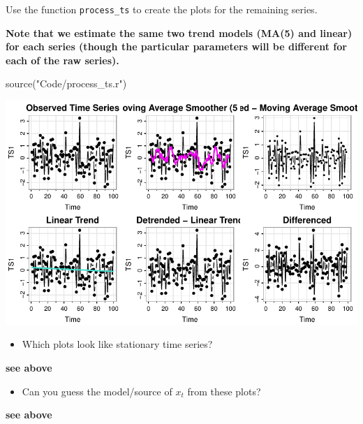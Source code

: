 \documentclass[
  letterpaper,
  DIV=11,
  numbers=noendperiod]{scrartcl}
\newenvironment{Shaded}{\begin{snugshade}}{\end{snugshade}}
\newcommand{\AttributeTok}[1]{\textcolor[rgb]{0.40,0.45,0.13}{#1}}
\newcommand{\FunctionTok}[1]{\textcolor[rgb]{0.28,0.35,0.67}{#1}}
\newcommand{\NormalTok}[1]{\textcolor[rgb]{0.00,0.23,0.31}{#1}}
\newcommand{\SpecialCharTok}[1]{\textcolor[rgb]{0.37,0.37,0.37}{#1}}
\newcommand{\StringTok}[1]{\textcolor[rgb]{0.13,0.47,0.30}{#1}}
\providecommand{\tightlist}{%
  \setlength{\itemsep}{0pt}\setlength{\parskip}{0pt}}\usepackage{longtable,booktabs,array}
\begin{document}
Use the function \texttt{process\_ts} to create the plots for the
remaining series.

\textbf{Note that we estimate the same two trend models (MA(5) and
linear) for each series (though the particular parameters will be
different for each of the raw series).}

\begin{Shaded}
\begin{Highlighting}[]
\FunctionTok{source}\NormalTok{(}\StringTok{"Code/process\_ts.r"}\NormalTok{)}
\end{Highlighting}
\end{Shaded}

\begin{Shaded}
\end{Shaded}

\includegraphics{Lecture7_files/figure-pdf/unnamed-chunk-16-1.pdf}

\begin{itemize}
\tightlist
\item
  Which plots look like stationary time series?
\end{itemize}

\textbf{see above}

\begin{itemize}
\tightlist
\item
  Can you guess the model/source of \(x_t\) from these plots?
\end{itemize}

\textbf{see above}
\end{document}

